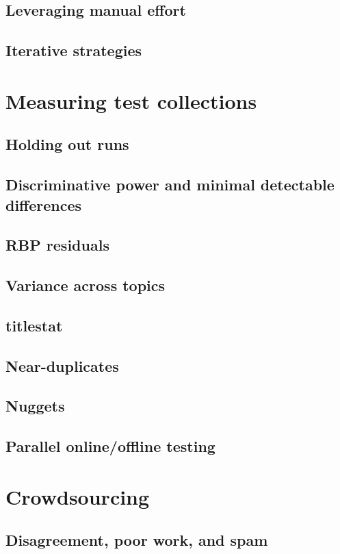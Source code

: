 \documentclass[nobib]{tufte-book}
\begin{document}
\section{Leveraging manual effort}
\section{Iterative strategies}

\chapter{Measuring test collections} \label{measuring-test-colls}

\section{Holding out runs}
\section{Discriminative power and minimal detectable differences}
\section{RBP residuals}
\section{Variance across topics}
\section{titlestat}
\section{Near-duplicates}
\section{Nuggets}
\section{Parallel online/offline testing}

\chapter{Crowdsourcing}

\section{Disagreement, poor work, and spam}
\end{document}
